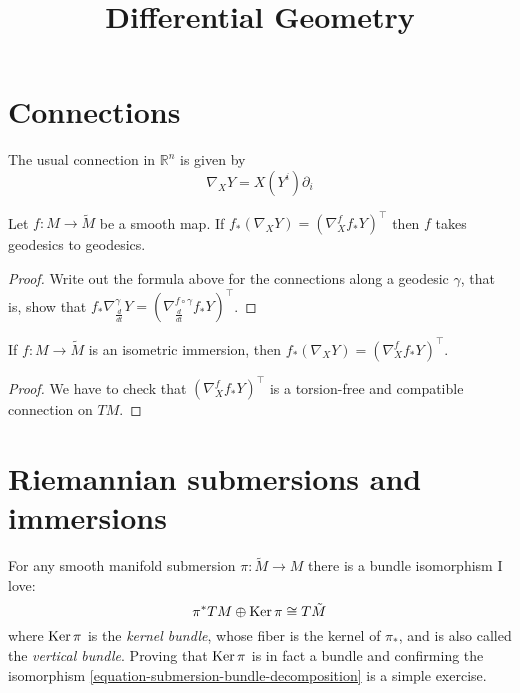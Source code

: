 



\title{Differential Geometry}
\maketitle

\label{section-phantom}

\tableofcontents

\section{Connections}
\label{section-connections}

\begin{example}
\label{example-euclidean-connection}
The usual connection in $\mathbb{R}^n$ is given by 
$$
\nabla_XY=X(Y^i)\partial_i
$$
\end{example}

\begin{proposition}
\label{proposition-map-preserves-connection-then-takes-geodesics-to-geodesics}
Let $f:M \to \tilde{M}$ be a smooth map. If 
$f_*(\nabla_XY)=(\nabla^f_Xf_*Y)^\top$ then $f$ takes geodesics to geodesics.
\end{proposition}

\begin{proof}
Write out the formula above for the connections along a geodesic $\gamma$, that
is, show that $f_*\nabla_{\frac{d}{dt}}^\gamma Y=\left(\nabla^{f\circ
\gamma}_{\frac{d}{dt}}f_*Y\right)^\top$.
\end{proof}

\begin{lemma}
\label{lemma-isommetry-preserves-connection}
If $f:M \to \tilde{M}$ is an isometric immersion, then 
$f_*(\nabla_XY)=(\nabla^f_Xf_*Y)^\top$.
\end{lemma}

\begin{proof}
We have to check that $(\nabla^f_Xf_*Y)^\top$ is a torsion-free and compatible
connection on $TM$.
\end{proof}


\section{Riemannian submersions and immersions}
\label{section-Riemannian-submersions-and-immersions}

For any smooth manifold submersion $\pi:\tilde{M}\to M$ there is a bundle
isomorphism I love: 
\begin{equation}
\label{equation-submersion-bundle-decomposition}
\pi^*TM \oplus \mathop{\mathrm{Ker}} \pi\cong
T\tilde{M} \end{equation}
 where $\mathop{\mathrm{Ker}}\pi$ is the {\it kernel bundle}, whose
fiber is the kernel of $\pi_*$, and is also called the {\it vertical bundle}.
Proving that $\mathop{\mathrm{Ker}}\pi$ is in fact a bundle and confirming the isomorphism
\ref{equation-submersion-bundle-decomposition} is a simple exercise.

